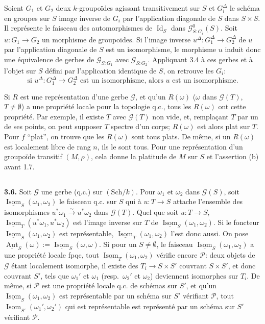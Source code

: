 \documentclass[12pt,a4paper]{article}
\theoremstyle{plain}
\theoremstyle{definition}
\theoremstyle{remark}
\DeclareMathOperator{\Aut}{Aut}
\DeclareMathOperator{\Isom}{Isom}
\DeclareMathOperator{\Id}{Id}
\begin{document}
Soient $G_1$ et $G_2$ deux $k$-groupoïdes agissant transitivement sur $S$ et $G_i^\Delta$ le schéma en groupes sur $S$ image inverse de $G_i$ par l'application diagonale de $S$ dans $S \times S$. Il représente le faisceau des automorphismes de $\Id_S$ dans $\mathcal{G}^0_{S:G_i}(S)$. Soit $u : G_1 \to G_2$ un morphisme de groupoïdes. Si l'image inverse $u^\Delta : G_1^\Delta \to G_2^\Delta$ de $u$ par l'application diagonale de $S$ est un isomorphisme, le morphisme $u$ induit donc une équivalence de gerbes de $\mathcal{G}_{S:G_1}$ avec $\mathcal{G}_{S:G_2}$. Appliquant 3.4 à ces gerbes et à l'objet sur $S$ défini par l'application identique de $S$, on retrouve les $G_i$:
\begin{equation}\label{eq:3.5.2}
\text{si } u^\Delta : G_1^\Delta \to G_2^\Delta \text{ est un isomorphisme, alors } u \text{ est un isomorphisme.}
\end{equation}

Si $R$ est une représentation d'une gerbe $\mathcal{G}$, et qu'un $R(\omega)$ ($\omega$ dans $\mathcal{G}(T)$, $T \neq \emptyset$) a une propriété locale pour la topologie q.c., tous les $R(\omega)$ ont cette propriété. Par exemple, il existe $T$ avec $\mathcal{G}(T)$ non vide, et, remplaçant $T$ par un de ses points, on peut supposer $T$ spectre d'un corps; $R(\omega)$ est alors plat sur $T$. Pour $f$ ``plat'', on trouve que les $R(\omega)$ sont tous plats. De même, si un $R(\omega)$ est localement libre de rang $n$, ils le sont tous. Pour une représentation d'un groupoïde transitif $(M,\rho)$, cela donne la platitude de $M$ sur $S$ et l'assertion (b) avant 1.7.

\subsection{}

\textbf{3.6.} Soit $\mathcal{G}$ une gerbe (q.c.) sur $(\mathrm{Sch}/k)$. Pour $\omega_1$ et $\omega_2$ dans $\mathcal{G}(S)$, soit $\underline{\Isom}_S(\omega_1,\omega_2)$ le faisceau q.c. sur $S$ qui à $u : T \to S$ attache l'ensemble des isomorphismes $u^*\omega_1 \xrightarrow{\sim} u^*\omega_2$ dans $\mathcal{G}(T)$. Quel que soit $u : T \to S$, $\underline{\Isom}_T(u^*\omega_1, u^*\omega_2)$ est l'image inverse sur $T$ de $\underline{\Isom}_S(\omega_1,\omega_2)$. Si le foncteur $\underline{\Isom}_S(\omega_1,\omega_2)$ est représentable, $\underline{\Isom}_T(\omega_1,\omega_2)$ l'est donc aussi. On pose $\underline{\Aut}_S(\omega) := \underline{\Isom}_S(\omega,\omega)$. Si pour un $S \neq \emptyset$, le faisceau $\underline{\Isom}_S(\omega_1,\omega_2)$ a une propriété locale fpqc, tout $\underline{\Isom}_T(\omega_1,\omega_2)$ vérifie encore $\mathcal{P}$: deux objets de $\mathcal{G}$ étant localement isomorphe, il existe des $T_i \to S \times S'$ couvrant $S \times S'$, et donc couvrant $S'$, tels que $\omega_1'$ et $\omega_1$ (resp.~$\omega_2'$ et $\omega_2$) deviennent isomorphes sur $T_i$. De même, si $\mathcal{P}$ est une propriété locale q.c. de schémas sur $S'$, et qu'un $\underline{\Isom}_S(\omega_1,\omega_2)$ est représentable par un schéma sur $S'$ vérifiant $\mathcal{P}$, tout $\underline{\Isom}_{S'}(\omega_1',\omega_2')$ qui est représentable est représenté par un schéma sur $S'$ vérifiant $\mathcal{P}$.
\end{document}
